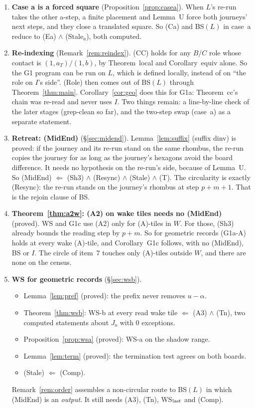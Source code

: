 \documentclass[11pt]{article}
\theoremstyle{definition}\newtheorem{definition}[theorem]{Definition}\newtheorem{remark}[theorem]{Remark}
\begin{document}
\begin{enumerate}
\item \textbf{Case a is a forced square} (Proposition~\ref{prop:casea}). When $L$'s re-run takes the other a-step, a finite placement and Lemma~U force both journeys' next steps, and they close a translated square. So (Ca) and BS$(L)$ in case~a reduce to (Ea) $\wedge$ (Stale$_a$), both computed.
\item \textbf{Re-indexing} (Remark~\ref{rem:reindex}). (CC) holds for any $B/C$ role whose contact is $(1,a_T)/(1,b)$, by Theorem~local and Corollary~equiv alone. So the G1 program can be run on $L$, which is defined locally, instead of on ``the role on $I$'s side''. (Role) then comes out of BS$(L)$ through Theorem~\ref{thm:main}. Corollary~\ref{cor:geo} does this for G1a: Theorem~cc's chain was re-read and never uses $I$. Two things remain: a line-by-line check of the later stages (grep-clean so far), and the two-step swap (case~a) as a separate statement.
\item \textbf{Retreat: (MidEnd)} (\S\ref{sec:midend}). Lemma~\ref{lem:suffix} (suffix dinv) is proved: if the journey and its re-run stand on the same rhombus, the re-run copies the journey for as long as the journey's hexagons avoid the board difference. It needs no hypothesis on the re-run's side, because of Lemma~U. So (MidEnd) $\Leftarrow$ (Sh3) $\wedge$ (Resync) $\wedge$ (Stale) $\wedge$ (T). The circularity is exactly (Resync): the re-run stands on the journey's rhombus at step $p+m+1$. That is the rejoin clause of BS.
\item \textbf{Theorem~\ref{thm:a2w}: (A2) on wake tiles needs no (MidEnd)} (proved). WS and G1c use (A2) only for (A)-tiles in $W$. For those, (Sh3) already bounds the reading step by $p+m$. So for geometric records (G1a-A) holds at every wake (A)-tile, and Corollary~G1c follows, with no (MidEnd), BS or $I$. The circle of item~7 touches only (A)-tiles outside $W$, and there are none on the census.
\item \textbf{WS for geometric records} (\S\ref{sec:wsb}).
\begin{itemize}
\item Lemma~\ref{lem:pref} (proved): the prefix never removes $u-\alpha$.
\item Theorem~\ref{thm:wsb}: WS-b at every read wake tile $\Leftarrow$ (A3) $\wedge$ (Tn), two computed statements about $J_o$ with 0 exceptions.
\item Proposition~\ref{prop:wsa} (proved): WS-a on the shadow range.
\item Lemma~\ref{lem:term} (proved): the termination test agrees on both boards.
\item (Stale) $\Leftarrow$ (Comp).
\end{itemize}
Remark~\ref{rem:order} assembles a non-circular route to BS$(L)$ in which (MidEnd) is an \emph{output}. It still needs (A3), (Tn), WS$_{\rm last}$ and (Comp).
\end{enumerate}
\end{document}
